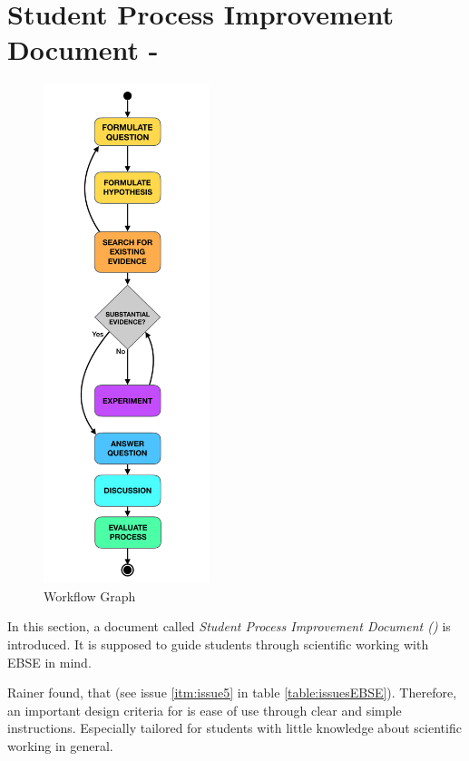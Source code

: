 
\section{Student Process Improvement Document - \checklist}
\label{sec:research process}

\begin{minipage}{\linewidth}
\begin{figure}
	\centering
	\vspace{-1.0cm}
	\includegraphics[trim={3cm 0 3cm 0}, height=14.55cm]{figures/workflow_graph.pdf}
	\caption{Workflow Graph}
	\label{fig:workflow_graph}
\end{figure}


In this section, a document called \emph{Student Process Improvement Document (\checklist{})} is introduced. It is supposed to guide students through scientific working with EBSE in mind.

Rainer \etal found, that  \cite{Rainer2006} (see issue \ref{itm:issue5} in table \ref{table:issuesEBSE}). Therefore, an important design criteria for \checklist{} is ease of use through clear and simple instructions. Especially tailored for students with little knowledge about scientific working in general.


\end{minipage}
